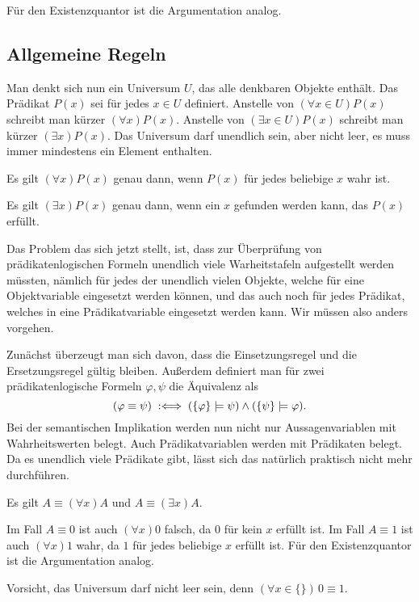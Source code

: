 Für den Existenzquantor ist die Argumentation analog.\;\qedsymbol

\subsection{Allgemeine Regeln}

Man denkt sich nun ein Universum $U$, das alle denkbaren Objekte
enthält. Das Prädikat $P(x)$ sei für jedes $x\in U$ definiert.
Anstelle von $(\forall x\in U)P(x)$ schreibt man kürzer
$(\forall x)P(x)$. Anstelle von $(\exists x\in U)P(x)$ schreibt
man kürzer $(\exists x)P(x)$. Das Universum darf unendlich sein,
aber nicht leer, es muss immer mindestens ein Element enthalten.
\begin{Definition}[Allquantor]
Es gilt $(\forall x)P(x)$ genau dann, wenn $P(x)$ für jedes
beliebige $x$ wahr ist.
\end{Definition}
\begin{Definition}[Existenzquantor]
Es gilt $(\exists x)P(x)$ genau dann, wenn ein $x$ gefunden
werden kann, das $P(x)$ erfüllt.
\end{Definition}
Das Problem das sich jetzt stellt, ist, dass zur Überprüfung
von prädikatenlogischen Formeln unendlich viele Warheitstafeln
aufgestellt werden müssten, nämlich für jedes der unendlich vielen
Objekte, welche für eine Objektvariable eingesetzt werden können, und das
auch noch für jedes Prädikat, welches in eine Prädikatvariable
eingesetzt werden kann. Wir müssen also anders vorgehen.

Zunächst überzeugt man sich davon, dass die Einsetzungsregel und die
Ersetzungsregel gültig bleiben. Außerdem definiert man für zwei
prädikatenlogische Formeln $\varphi,\psi$ die Äquivalenz als
\[(\varphi\equiv\psi)\;:\Longleftrightarrow\; (\{\varphi\}\models\psi)\land (\{\psi\}\models\varphi).\]
Bei der semantischen Implikation werden nun nicht nur Aussagenvariablen mit
Wahrheitswerten belegt. Auch Prädikatvariablen werden mit Prädikaten
belegt. Da es unendlich viele Prädikate gibt, lässt sich das natürlich
praktisch nicht mehr durchführen.
\begin{Satz}
Es gilt $A\equiv (\forall x)A$ und $A\equiv(\exists x)A$.
\end{Satz}
 Im Fall $A\equiv 0$ ist auch
$(\forall x)0$ falsch, da $0$ für kein $x$ erfüllt ist.
Im Fall $A\equiv 1$ ist auch $(\forall x)1$ wahr, da $1$ für jedes
beliebige $x$ erfüllt ist. Für den Existenzquantor ist die
Argumentation analog.\;\qedsymbol

Vorsicht, das Universum darf nicht leer sein,
denn $(\forall x{\in}\{\})\,0\equiv 1$.

